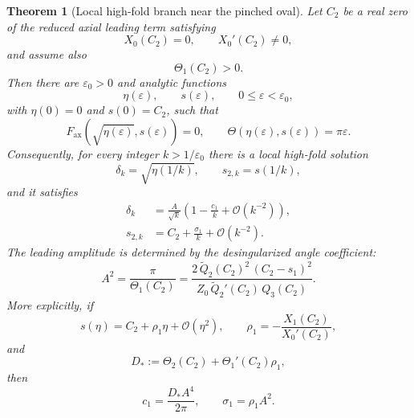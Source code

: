 \documentclass[11pt,a4paper]{article}
\theoremstyle{plain}
\newtheorem{theorem}{Theorem}[section]
\theoremstyle{definition}
\theoremstyle{remark}
\newcommand{\Oo}{\mathcal{O}}
\begin{document}
\begin{theorem}[Local high-fold branch near the pinched oval]
\label{thm:local-high-fold-branch}
Let $C_2$ be a real zero of the reduced axial leading term satisfying
\begin{equation}\label{eq:B2-nondeg-axial}
  X_0(C_2)=0,
  \qquad
  X_0'(C_2)\ne0,
\end{equation}
and assume also
\begin{equation}\label{eq:B2-nondeg-angle}
  \Theta_1(C_2)>0 .
\end{equation}
Then there are $\varepsilon_0>0$ and analytic functions
\[
  \eta(\varepsilon),\qquad s(\varepsilon),
  \qquad 0\le \varepsilon<\varepsilon_0,
\]
with $\eta(0)=0$ and $s(0)=C_2$, such that
\begin{equation}\label{eq:B2-local-system}
  F_{\mathrm{ax}}(\sqrt{\eta(\varepsilon)},s(\varepsilon))=0,
  \qquad
  \Theta(\eta(\varepsilon),s(\varepsilon))=\pi\varepsilon .
\end{equation}
Consequently, for every integer $k>1/\varepsilon_0$ there is a local
high-fold solution
\[
  \delta_k=\sqrt{\eta(1/k)},
  \qquad
  s_{2,k}=s(1/k),
\]
and it satisfies
\begin{align}
  \delta_k
  &=
  \frac{A}{\sqrt{k}}
  \left(1-\frac{c_1}{k}+\Oo(k^{-2})\right),
  \label{eq:B2-delta-expansion}\\
  s_{2,k}
  &=
  C_2+\frac{\sigma_1}{k}+\Oo(k^{-2}).
  \label{eq:B2-s2-expansion}
\end{align}
The leading amplitude is determined by the desingularized angle
coefficient:
\begin{equation}\label{eq:B2-A2}
  A^2
  =
  \frac{\pi}{\Theta_1(C_2)}
  =
  \frac{2\,\tilde Q_2(C_2)^2\,(C_2-s_1)^2}
       {Z_0\,\tilde Q_2'(C_2)\,Q_3(C_2)} .
\end{equation}
More explicitly, if
\[
  s(\eta)=C_2+\rho_1\eta+\Oo(\eta^2),
  \qquad
  \rho_1=-\frac{X_1(C_2)}{X_0'(C_2)},
\]
and
\begin{equation}\label{eq:B2-Dstar}
  D_* := \Theta_2(C_2)+\Theta_1'(C_2)\rho_1,
\end{equation}
then
\begin{equation}\label{eq:B2-c1-formula}
  c_1=
  \frac{D_* A^4}{2\pi},
  \qquad
  \sigma_1=\rho_1 A^2 .
\end{equation}
\end{theorem}
\end{document}
